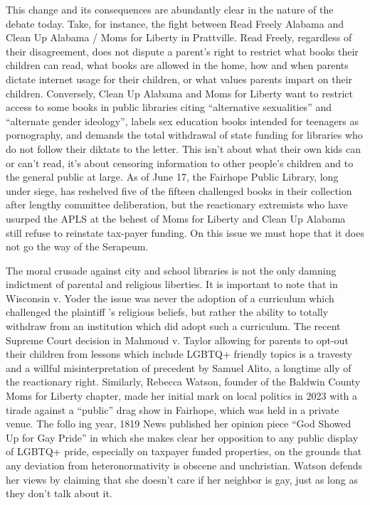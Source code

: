 \documentclass[
]{book}
\begin{document}
This change and its consequences are abundantly clear in the nature of the debate today. Take, for instance, the fight between Read Freely Alabama and Clean Up Alabama / Moms for Liberty in Prattville. Read Freely, regardless of their disagreement, does not dispute a parent's right to restrict what books their children can read, what books are allowed in the home, how and when parents dictate internet usage for their children, or what values parents impart on their children. Conversely, Clean Up Alabama and Moms for Liberty want to restrict access to some books in public libraries citing ``alternative sexualities'' and ``alternate gender ideology'', labels sex education books intended for teenagers as pornography, and demands the total withdrawal of state funding for libraries who do not follow their diktats to the letter. This isn't about what their own kids can or can't read, it's about censoring information to other people's children and to the general public at large. As of June 17, the Fairhope Public Library, long under siege, has reshelved five of the fifteen challenged books in their collection after lengthy committee deliberation, but the reactionary extremists who have usurped the APLS at the behest of Moms for Liberty and Clean Up Alabama still refuse to reinstate tax-payer funding. On this issue we must hope that it does not go the way of the Serapeum.

The moral crusade against city and school libraries is not the only damning indictment of parental and religious liberties. It is important to note that in Wisconsin v. Yoder the issue was never the adoption of a curriculum which challenged the plaintiff 's religious beliefs, but rather the ability to totally withdraw from an institution which did adopt such a curriculum. The recent Supreme Court decision in Mahmoud v. Taylor allowing for parents to opt-out their children from lessons which include LGBTQ+ friendly topics is a travesty and a willful misinterpretation of precedent by Samuel Alito, a longtime ally of the reactionary right. Similarly, Rebecca Watson, founder of the Baldwin County Moms for Liberty chapter, made her initial mark on local politics in 2023 with a tirade against a ``public'' drag show in Fairhope, which was held in a private venue. The follo ing year, 1819 News published her opinion piece ``God Showed Up for Gay Pride'' in which she makes clear her opposition to any public display of LGBTQ+ pride, especially on taxpayer funded properties, on the grounds that any deviation from heteronormativity is obscene and unchristian. Watson defends her views by claiming that she doesn't care if her neighbor is gay, just as long as they don't talk about it.
\end{document}
